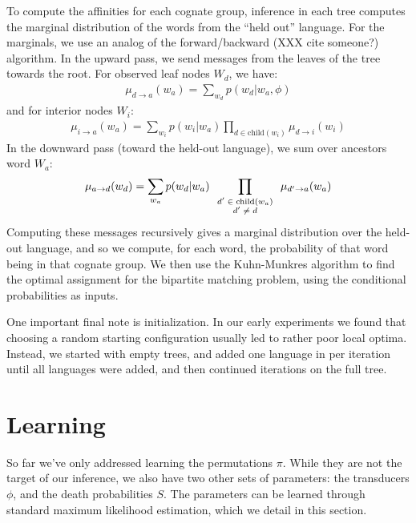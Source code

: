 \documentclass[11pt,a4paper]{article}
\begin{document}
To compute the affinities for each cognate group, inference in each
tree computes the marginal distribution of the words from the ``held
out'' language. For the marginals, we use an analog of the 
forward/backward (XXX cite someone?) algorithm. In the upward pass,
we send messages from the leaves of the tree towards the root. For observed
leaf nodes $W_d$, we have:
\begin{equation*}
  \begin{split}
    \mu_{d\to a}(w_a) = \sum_{w_d} p(w_d|w_a,\phi)
   \end{split}
 \end{equation*}
and for interior nodes $W_i$:
\begin{equation*}
  \begin{split}
    \mu_{i\to a}(w_a) = \sum_{w_i} p(w_i|w_a) \prod_{d \in \mathrm{child}(w_i)} \mu_{d \to i}(w_i) 
  \end{split}
\end{equation*}
In the downward pass (toward the held-out language), we sum over ancestors word $W_a$:
\begin{equation*}
  \begin{split}
    \mu_{a\to d}(w_d) = \sum_{w_a} p(w_d|w_a) \prod_{\scriptsize \begin{array}{cc}d' \in \mathrm{child}(w_a) \\ d' \neq d \end{array}} \mu_{d' \to a}(w_a) 
  \end{split}
\end{equation*}
Computing these messages recursively gives a marginal distribution
over the held-out language, and so we compute, for each word, the
probability of that word being in that cognate group. We then use
the Kuhn-Munkres algorithm \cite{Kuhn1955} to find the optimal
assignment for the bipartite matching problem, using the conditional
probabilities as inputs.

One important final note is initialization. In our early experiments
we found that choosing a random starting configuration usually led
to rather poor local optima. Instead, we started with empty trees,
and added one language in per iteration until all languages were
added, and then continued iterations on the full tree.

\section{Learning}
So far we've only addressed learning the permutations $\pi$. While
they are not the target of our inference, we also have two other
sets of parameters: the transducers $\phi$, and the death probabilities
$S$. The parameters can be learned through standard maximum likelihood
estimation, which we detail in this section.
\end{document}
